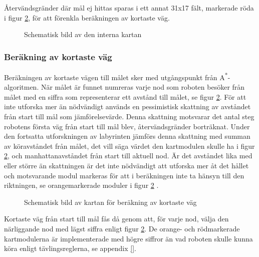 \documentclass[11pt]{article}
\begin{document}
\begin{flushleft}
Återvändsgränder där mål ej hittas sparas i ett annat 31x17 fält, markerade röda i figur \ref{path}, för att förenkla beräkningen av kortaste väg. 

\begin{figure}[htbp]
\centering
\noindent\resizebox{0.7\linewidth}{!}{
	}
	\caption{Schematisk bild av den interna kartan}	\label{map}
\end{figure}

\subsubsection{Beräkning av kortaste väg} \label{shortestPath}
Beräkningen av kortaste vägen till målet sker med utgångspunkt från A\textsuperscript{*}-algoritmen. När målet är funnet numreras varje nod som roboten besöker från målet med en siffra som representerar ett avstånd till målet, se figur \ref{path}. För att inte utforska mer än nödvändigt används en pessimistisk skattning av avståndet från start till mål som jämförelsevärde. Denna skattning motsvarar det antal steg robotens första väg från start till mål blev, återvändsgränder borträknat. Under den fortsatta utforskningen av labyrinten jämförs denna skattning med summan av köravståndet från målet, det vill säga värdet den kartmodulen skulle ha i figur \ref{path}, och manhattanavståndet från start till aktuell nod. Är det avståndet lika med eller större än skattningen är det inte nödvändigt att utforska mer åt det hållet och motsvarande modul markeras för att i beräkningen inte ta hänsyn till den riktningen, se orangemarkerade moduler i figur \ref{path} .

\begin{figure}[htbp]
\centering
\noindent\resizebox{0.7\linewidth}{!}{
	}
	\caption{Schematisk bild av kartan för beräkning av kortaste väg}	\label{path}
\end{figure}


Kortaste väg från start till mål fås då genom att, för varje nod, välja den närliggande nod med lägst siffra enligt figur \ref{path}. De orange- och rödmarkerade kartmodulerna är implementerade med högre siffror än vad roboten skulle kunna köra  enligt tävlingsreglerna, se appendix \ref{}.

\pagebreak


\end{flushleft}
\end{document}
